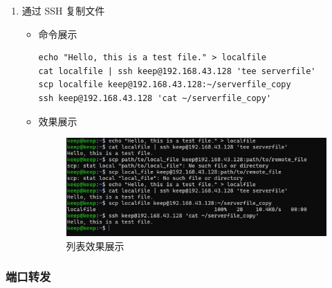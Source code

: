\documentclass[UTF8]{ctexart}
\begin{document}
\begin{enumerate}
  \item 通过 SSH 复制文件
  \begin{itemize}
  \item 命令展示
  \begin{verbatim}
echo "Hello, this is a test file." > localfile
cat localfile | ssh keep@192.168.43.128 'tee serverfile'
scp localfile keep@192.168.43.128:~/serverfile_copy
ssh keep@192.168.43.128 'cat ~/serverfile_copy'

  \end{verbatim}
\item 效果展示
  \begin{figure}[H]
    \centering
    \includegraphics[width=\textwidth]{117} %
    \caption{列表效果展示}
  \end{figure}
  \end{itemize}
\end{enumerate}

\subsubsection{端口转发}
\end{document}
